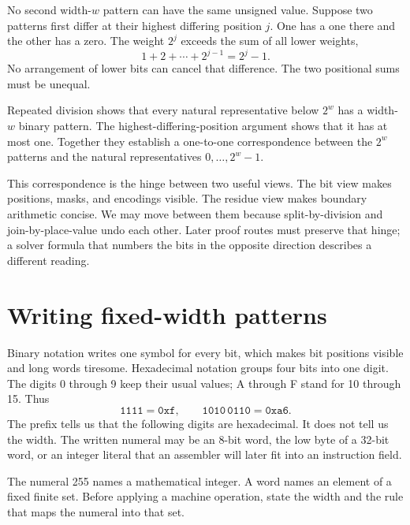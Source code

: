 No second width-\(w\) pattern can have the same unsigned value. Suppose two
patterns first differ at their highest differing position \(j\). One has a
one there and the other has a zero. The weight \(2^j\) exceeds the sum of all
lower weights,
\[
  1+2+\cdots+2^{j-1}=2^j-1.
\]
No arrangement of lower bits can cancel that difference. The two positional
sums must be unequal.

\begin{proofkit}[title={\iconProofKit\ Existence and uniqueness are separate}]
Repeated division shows that every natural representative below \(2^w\) has
a width-\(w\) binary pattern. The highest-differing-position argument shows
that it has at most one. Together they establish a one-to-one correspondence
between the \(2^w\) patterns and the natural representatives
\(0,\ldots,2^w-1\).
\end{proofkit}

This correspondence is the hinge between two useful views. The bit view makes
positions, masks, and encodings visible. The residue view makes boundary
arithmetic concise. We may move between them because split-by-division and
join-by-place-value undo each other. Later proof routes must preserve
that hinge; a solver formula that numbers the bits in the opposite direction
describes a different reading.

\section{Writing fixed-width patterns}

Binary notation writes one symbol for every bit, which makes bit positions
visible and long words tiresome. Hexadecimal notation groups four bits into
one digit. The digits 0 through 9 keep their usual values; A through F stand
for 10 through 15. Thus
\[
  \mathtt{1111}=\mathtt{0xf}, \qquad
  \mathtt{1010\,0110}=\mathtt{0xa6}.
\]
The prefix  tells us that the following digits are hexadecimal. It
does not tell us the width. The written numeral  may be an 8-bit
word, the low byte of a 32-bit word, or an integer literal that an assembler
will later fit into an instruction field.

\begin{keyidea}[title={A value is not yet a width}]
The numeral 255 names a mathematical integer. A word names an element of a
fixed finite set. Before applying a machine operation, state the width and the
rule that maps the numeral into that set.
\end{keyidea}

